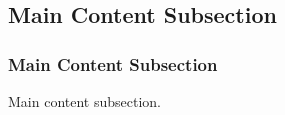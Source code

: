 \subsection{Main Content Subsection}
\begin{frame}
    \frametitle{Main Content Subsection}
    Main content subsection.
\end{frame}